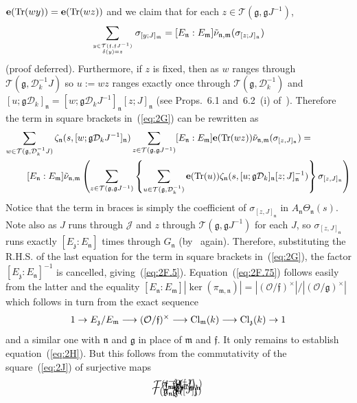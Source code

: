 \documentclass[12pt]{article}
\newcounter{rem}[section]%
\newcommand{\be}{\ensuremath{{\bf e}}}
\newcommand{\beql}[1]{\begin{equation}\label{#1}}
\newcommand{\cD}{\ensuremath{\mathcal{D}}}
\newcommand{\cJ}{\ensuremath{\mathcal{J}}}
\newcommand{\Cl}{{\rm Cl}}
\newcommand{\cO}{\ensuremath{\mathcal{O}}}
\newcommand{\cT}{\ensuremath{\mathcal{T}}}
\newcommand{\eeq}{\end{equation}}
\newcommand{\ff}{\ensuremath{\mathfrak{f}}}
\newcommand{\fg}{\ensuremath{\mathfrak{g}}}
\newcommand{\fm}{\ensuremath{\mathfrak{m}}}
\newcommand{\fn}{\ensuremath{\mathfrak{n}}}
\newcommand{\fz}{\ensuremath{\mathfrak{z}}}
\newcommand{\inv}{^{-1}}%
\newcommand{\refeq}[1]{~(\ref{eq:#1})}
\newcommand{\rem}{\refstepcounter{rem}\noindent{\sc Remark \therem}}%
\renewcommand{\therem}{\thesection.\arabic{rem}}
\newcommand{\Tr}{{\rm Tr}}
\begin{document}
$\be(\Tr(wy))=\be(\Tr(wz))$ and we claim that
for each $z\in\cT(\fg,\fg J\inv)$,
\beql{eq:2H}
\sum_{{y\in\cT(\ff,\ff J\inv)}\atop{\delta(y)=z}}\sigma_{[y;J]_\fm}=
[E_{\fn}:E_{\fm}]\tilde{\nu}_{\fn,\fm}(\sigma_{[z;J]_{\fn}})
\eeq
(proof deferred). Furthermore,
if $z$ is fixed, then as $w$ ranges through $\cT(\fg,\cD_k\inv J)$
so $u:=wz$ ranges exactly once through $\cT(\fg,\cD_k\inv)$ and
$[u;\fg\cD_k]_{\fn}=[w;\fg\cD_k J\inv]_{\fn}[z;J]_{\fn}$
(see Props.~6.1 and~6.2~(i) of~\cite{twizas}).
Therefore the term in square brackets in\refeq{2G} can be rewritten as
\begin{eqnarray}
\lefteqn{\sum_{w\in\cT(\fg,\cD_k\inv J)}
\zeta_{\fn}(s,[w;\fg\cD_k J\inv]_{\fn})
\sum_{z\in\cT(\fg,\fg J\inv)}
[E_{\fn}:E_{\fm}]\be(\Tr(wz))\tilde{\nu}_{\fn,\fm}(\sigma_{[z,J]_{\fn}})
=
}\hspace*{3ex}&&\nonumber\\
&&[E_{\fn}:E_{\fm}]
\tilde{\nu}_{\fn,\fm}\left(
\sum_{z\in\cT(\fg,\fg J\inv)}
\left\{\sum_{u\in\cT(\fg,\cD_k\inv)}
\be(\Tr(u))\zeta_{\fn}(s,[u;\fg\cD_k]_{\fn}[z;J]_{\fn}\inv)
\right\}
\sigma_{[z,J]_{\fn}}
\right)\nonumber
\end{eqnarray}
Notice that the term in braces is simply the coefficient of
$\sigma_{[z,J]_{\fn}}$ in $A_{\fn}\Theta_{\fn}(s)$. Note also
as $J$ runs through $\cJ$ and $z$ through $\cT(\fg,\fg J\inv)$ for each $J$,
so $\sigma_{[z,J]_{\fn}}$ runs exactly $[E_\fz:E_{\fn}]$ times through
$G_{\fn}$ (by~\cite[Prop./Def.~6.1]{twizas} again).
Therefore, substituting the R.H.S.
of the last equation for the term in square brackets in\refeq{2G}, the factor
$[E_\fz:E_{\fn}]\inv$ is cancelled, giving\refeq{2F.5}.
Equation\refeq{2F.75} follows easily from the latter
and the equality $[E_{\fn}:E_{\fm}]|\ker(\pi_{\fm,\fn})|=
|(\cO/\ff)^\times|/|(\cO/\fg)^\times|$ which
follows  in turn from the exact sequence
\beql{eq:2I}
1\rightarrow E_\fz/E_\fm\longrightarrow
(\cO/\ff)^\times\longrightarrow\Cl_{\fm}(k)
\longrightarrow\Cl_\fz(k)\rightarrow 1
\eeq
and a similar one with $\fn$ and $\fg$ in place of $\fm$ and
$\ff$.
It only remains to establish equation\refeq{2H}. But this follows from the commutativity
of the square\refeq{2J} of surjective maps
\begin{figure}
\setlength{\unitlength}{4mm}
\beql{eq:2J}
\begin{picture}(10,8)(-1,0)
\put(2.5,0.5){\vector(1,0){3}}
\put(2.5,7.5){\vector(1,0){3}}
\put(0,6.7){\vector(0,-1){5.4}}
\put(8,6.7){\vector(0,-1){5.4}}
\put(4,1){\makebox(0,0)[b]{$\beta$}}
\put(4,8){\makebox(0,0)[b]{$\alpha$}}
\put(0.5,4){\makebox(0,0)[l]{$\delta$}}
\put(8.5,4){\makebox(0,0)[l]{$\pi_{\fm,\fn}$}}
\put(0,0.5){\makebox(0,0){$\cT(\fg,\fg J\inv)$}}
\put(0,7.5){\makebox(0,0){$\cT(\ff,\ff J\inv)$}}
\put(8,0.5){\makebox(0,0){$\pi_{\fn,\fz}\inv([J]_\fz)$}}
\put(8,7.5){\makebox(0,0){$\pi_{\fm,\fz}\inv([J]_\fz)$}}
\end{picture}
\eeq
\end{figure}
\end{document}

